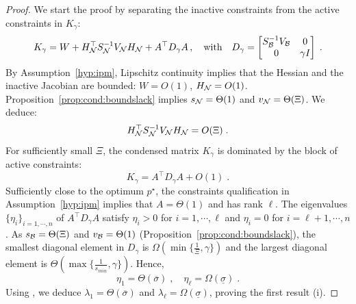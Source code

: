 \begin{proof}
  We start the proof by separating the inactive constraints from the active constraints in $K_\gamma$:
  \begin{equation}
    K_\gamma = W + H_{\mathcal{N}}^\top S_{\mathcal{N}}^{-1} V_{\mathcal{N}} H_{\mathcal{N}}
    + A^\top D_\gamma A \, ,
    \quad
    \text{with} \quad D_\gamma = \begin{bmatrix} S_{\mathcal{B}}^{-1} V_{\mathcal{B}} & 0 \\ 0 & \gamma I \end{bmatrix} \; .
  \end{equation}
  By Assumption~\ref{hyp:ipm}, Lipschitz
  continuity implies that the Hessian and the inactive Jacobian
  are bounded: $W = O(1)$, $H_{\mathcal{N}} = O(1)$.
  Proposition~\ref{prop:cond:boundslack} implies
  $s_{\mathcal{N}} = \Theta(1)$ and $v_{\mathcal{N}} = \Theta(\Xi)$. We deduce:
  \begin{equation}
    \label{eq:cond:inactiveblock}
    H_{\mathcal{N}}^\top S_{\mathcal{N}}^{-1} V_{\mathcal{N}} H_{\mathcal{N}} = O(\Xi) \; .
  \end{equation}
  For sufficiently small $\Xi$,
  the condensed matrix $K_\gamma$ is dominated by the block of active constraints:
  \begin{equation}
    K_\gamma = A^\top D_\gamma A + O(1) \; .
  \end{equation}
  Sufficiently close to the optimum $p^\star$, the constraints qualification
  in Assumption~\ref{hyp:ipm} implies that $A = \Theta(1)$ and has rank $\ell$.
  The eigenvalues $\{\eta_i\}_{i =1,\cdots,n}$ of $A^\top D_\gamma A$
  satisfy $\eta_i > 0$ for $i = 1,\cdots,\ell$ and $\eta_i = 0$ for $i = \ell+1, \cdots, n$.
  As $s_{\mathcal{B}} = \Theta(\Xi)$ and $v_{\mathcal{B}} = \Theta(1)$
  (Proposition~\ref{prop:cond:boundslack}), the smallest diagonal
  element in $D_\gamma$ is $\Omega(\min\{\frac{1}{\Xi}, \gamma\})$
  and the largest diagonal element is $\Theta(\max\{\frac{1}{s_{min}}, \gamma\})$.
  Hence,
  \begin{equation}
    \eta_1 = \Theta(\overline{\sigma}) \; , \quad
    \eta_\ell = \Omega(\underline{\sigma}) \; .
  \end{equation}
  Using \cite[Lemma 3.1]{wright1998ill}, we deduce $\lambda_1 = \Theta(\overline{\sigma})$
  and $\lambda_\ell = \Omega(\underline{\sigma})$, proving the first result (i).


\end{proof}
